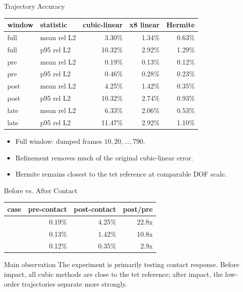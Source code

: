 \documentclass[aspectratio=169,10pt]{beamer}
\newcommand{\case}[1]{\texttt{\detokenize{#1}}}
\newcommand{\pct}[1]{#1\%}
\newcommand{\good}[1]{\textcolor{pgoGreen}{#1}}
\begin{document}
\begin{frame}{Trajectory Accuracy}
  \small
  \begin{table}
    \centering
    \begin{tabular}{llrrr}
      \toprule
      window & statistic & cubic-linear & x8 linear & Hermite \\
      \midrule
      full & mean rel L2 & \pct{3.30} & \pct{1.34} & \good{\pct{0.63}} \\
      full & p95 rel L2 & \pct{10.32} & \pct{2.92} & \good{\pct{1.29}} \\
      pre & mean rel L2 & \pct{0.19} & \pct{0.13} & \good{\pct{0.12}} \\
      pre & p95 rel L2 & \pct{0.46} & \pct{0.28} & \good{\pct{0.23}} \\
      post & mean rel L2 & \pct{4.25} & \pct{1.42} & \good{\pct{0.35}} \\
      post & p95 rel L2 & \pct{10.32} & \pct{2.74} & \good{\pct{0.93}} \\
      late & mean rel L2 & \pct{6.33} & \pct{2.06} & \good{\pct{0.53}} \\
      late & p95 rel L2 & \pct{11.47} & \pct{2.92} & \good{\pct{1.10}} \\
      \bottomrule
    \end{tabular}
  \end{table}

  \vspace{0.8em}
  \begin{itemize}
    \item Full window: dumped frames $10,20,\ldots,790$.
    \item Refinement removes much of the original cubic-linear error.
    \item Hermite remains closest to the tet reference at comparable DOF scale.
  \end{itemize}
\end{frame}

\begin{frame}{Before vs. After Contact}
  \small
  \begin{table}
    \centering
    \begin{tabular}{lrrr}
      \toprule
      case & pre-contact & post-contact & post/pre \\
      \midrule
      \case{cubic_linear} & \pct{0.19} & \pct{4.25} & 22.8x \\
      \case{cubic_linear_x8} & \pct{0.13} & \pct{1.42} & 10.8x \\
      \case{cubic_hermite} & \good{\pct{0.12}} & \good{\pct{0.35}} & \good{2.9x} \\
      \bottomrule
    \end{tabular}
  \end{table}

  \vspace{0.8em}
  \begin{block}{Main observation}
    The experiment is primarily testing contact response. Before impact, all
    cubic methods are close to the tet reference; after impact, the low-order
    trajectories separate more strongly.
  \end{block}
\end{frame}
\end{document}
